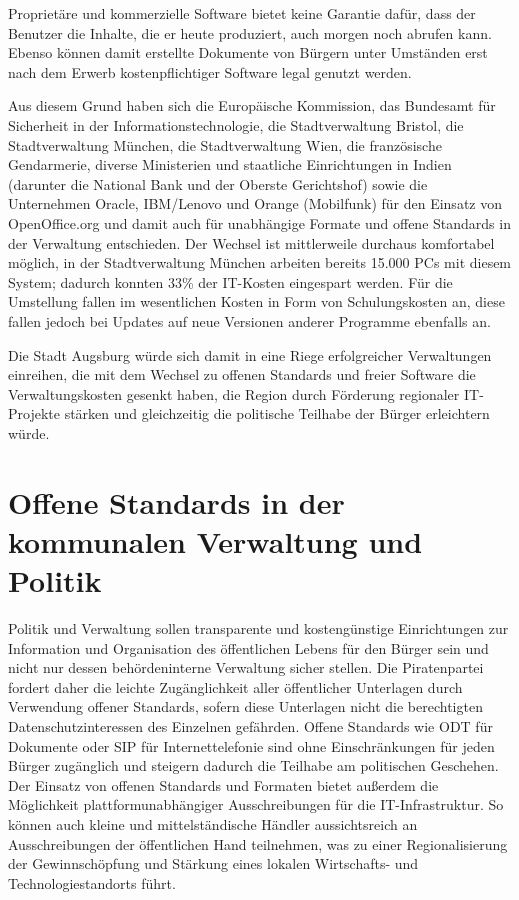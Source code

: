   Proprietäre und kommerzielle Software bietet keine Garantie dafür, dass der 
  Benutzer die Inhalte, die er heute produziert, auch morgen noch abrufen 
  kann. Ebenso können damit erstellte Dokumente von Bürgern unter Umständen 
  erst nach dem Erwerb kostenpflichtiger Software legal genutzt werden.
  
  Aus diesem Grund haben sich die Europäische Kommission, das Bundesamt für 
  Sicherheit in der Informationstechnologie, die Stadtverwaltung Bristol, die 
  Stadtverwaltung München, die Stadtverwaltung Wien, die französische 
  Gendarmerie, diverse Ministerien und staatliche Einrichtungen in Indien 
  (darunter die National Bank und der Oberste Gerichtshof) sowie die 
  Unternehmen Oracle, IBM/Lenovo und Orange (Mobilfunk) für den Einsatz von 
  OpenOffice.org und damit auch für unabhängige Formate und offene Standards 
  in der Verwaltung entschieden. Der Wechsel ist mittlerweile durchaus 
  komfortabel möglich, in der Stadtverwaltung München arbeiten bereits 15.000 
  PCs mit diesem System; dadurch konnten 33\% der IT-Kosten eingespart werden. 
  Für die Umstellung fallen im wesentlichen Kosten in Form von Schulungskosten 
  an, diese fallen jedoch bei Updates auf neue Versionen anderer Programme 
  ebenfalls an.
  
  Die Stadt Augsburg würde sich damit in eine Riege erfolgreicher Verwaltungen 
  einreihen, die mit dem Wechsel zu offenen Standards und freier Software die 
  Verwaltungskosten gesenkt haben, die Region durch Förderung regionaler 
  IT-Projekte stärken und gleichzeitig die politische Teilhabe der Bürger 
  erleichtern würde.
  
  \section{Offene Standards in der kommunalen Verwaltung und Politik}
  
  Politik und Verwaltung sollen transparente und kostengünstige Einrichtungen 
  zur Information und Organisation des öffentlichen Lebens für den Bürger sein 
  und nicht nur dessen behördeninterne Verwaltung sicher stellen. Die 
  Piratenpartei fordert daher die leichte Zugänglichkeit aller öffentlicher 
  Unterlagen durch Verwendung offener Standards, sofern diese Unterlagen nicht 
  die berechtigten Datenschutzinteressen des Einzelnen gefährden. Offene 
  Standards wie ODT für Dokumente oder SIP für Internettelefonie sind ohne 
  Einschränkungen für jeden Bürger zugänglich und steigern dadurch die 
  Teilhabe am politischen Geschehen. Der Einsatz von offenen Standards und 
  Formaten bietet außerdem die Möglichkeit plattformunabhängiger 
  Ausschreibungen für die IT-Infrastruktur. So können auch kleine und 
  mittelständische Händler aussichtsreich an Ausschreibungen der öffentlichen 
  Hand teilnehmen, was zu einer Regionalisierung der Gewinnschöpfung und 
  Stärkung eines lokalen Wirtschafts- und Technologiestandorts führt.